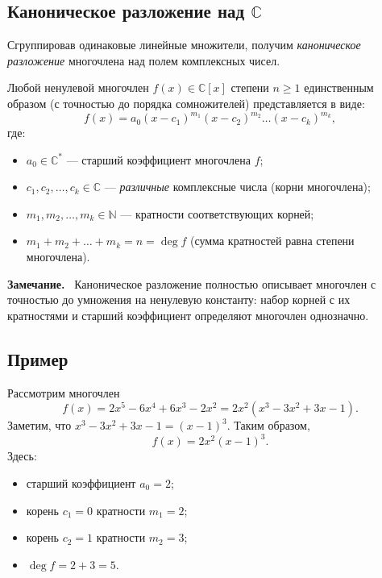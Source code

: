 \documentclass[a4paper,12pt]{article}
\newcommand{\myremark}{\textbf{Замечание.}\ }
\theoremstyle{definition}
\theoremstyle{plain}
\theoremstyle{remark}
\begin{document}
	\subsection{Каноническое разложение над \( \mathbb{C} \)}
	
	Сгруппировав одинаковые линейные множители, получим \textit{каноническое разложение} многочлена над полем комплексных чисел.
	
	\begin{tcolorbox}[colback=green!5, colframe=green!50!black, title=Каноническое разложение]
		Любой ненулевой многочлен \( f(x) \in \mathbb{C}[x] \) степени \( n \geq 1 \) единственным образом (с точностью до порядка сомножителей) представляется в виде:
		\[
		f(x) = a_0 (x - c_1)^{m_1} (x - c_2)^{m_2} \dots (x - c_k)^{m_k},
		\]
		где:
		\begin{itemize}
			\item \( a_0 \in \mathbb{C}^* \) — старший коэффициент многочлена \( f \);
			\item \( c_1, c_2, \dots, c_k \in \mathbb{C} \) — \textit{различные} комплексные числа (корни многочлена);
			\item \( m_1, m_2, \dots, m_k \in \mathbb{N} \) — кратности соответствующих корней;
			\item \( m_1 + m_2 + \dots + m_k = n = \deg f \) (сумма кратностей равна степени многочлена).
		\end{itemize}
	\end{tcolorbox}
	
	\myremark
	Каноническое разложение полностью описывает многочлен с точностью до умножения на ненулевую константу: набор корней с их кратностями и старший коэффициент определяют многочлен однозначно.
	
	\subsection{Пример}
	
	Рассмотрим многочлен
	\[
	f(x) = 2x^5 - 6x^4 + 6x^3 - 2x^2 = 2x^2 (x^3 - 3x^2 + 3x - 1).
	\]
	Заметим, что \( x^3 - 3x^2 + 3x - 1 = (x - 1)^3 \). Таким образом,
	\[
	f(x) = 2x^2 (x - 1)^3.
	\]
	Здесь:
	\begin{itemize}
		\item старший коэффициент \( a_0 = 2 \);
		\item корень \( c_1 = 0 \) кратности \( m_1 = 2 \);
		\item корень \( c_2 = 1 \) кратности \( m_2 = 3 \);
		\item \( \deg f = 2 + 3 = 5 \).
	\end{itemize}
	
\end{document}
